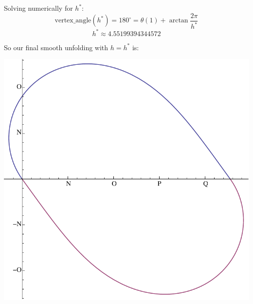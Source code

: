 \documentclass[12pt]{article}
\begin{document}
Solving numerically for $h^*$:
$$ \text{vertex\_angle}(h^*)= 180^\circ= \theta(1)+\arctan \frac{2\pi}{h^*}$$
$$h^*\approx 4.55199394344572$$

So our final smooth unfolding with $h=h^*$ is:
\begin{center}
\includegraphics[scale=.4]{unfold_h=h*.pdf}
\end{center}
\end{document}
